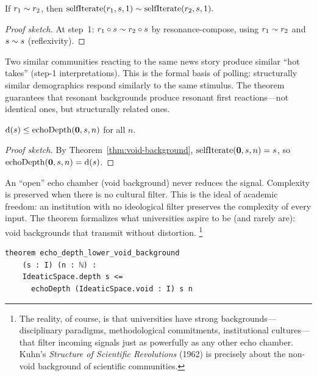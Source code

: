\begin{theorem}
\label{thm:parallel-echo}
If $r_1\sim r_2$, then
$\mathrm{selfIterate}(r_1, s, 1) \sim \mathrm{selfIterate}(r_2, s, 1).$
\end{theorem}

\begin{proof}[Proof sketch]
At step~1: $r_1\circ s \sim r_2\circ s$ by resonance-compose,
using $r_1\sim r_2$ and $s\sim s$ (reflexivity).
\end{proof}

Two similar communities reacting to the same news story produce similar
``hot takes'' (step-1 interpretations).  This is the formal basis of
polling: structurally similar demographics respond similarly to the same
stimulus.  The theorem guarantees that resonant backgrounds produce resonant
first reactions---not identical ones, but structurally related ones.

\begin{theorem}
\label{thm:echo-depth-lower}
$\operatorname{d}(s) \le \mathrm{echoDepth}(\mathbf{0}, s, n)$ for all $n$.
\end{theorem}

\begin{proof}[Proof sketch]
By Theorem~\ref{thm:void-background},
$\mathrm{selfIterate}(\mathbf{0},s,n)=s$, so
$\mathrm{echoDepth}(\mathbf{0},s,n)=\operatorname{d}(s)$.
\end{proof}

An ``open'' echo chamber (void background) never reduces the signal.
Complexity is preserved when there is no cultural filter.  This is the ideal
of academic freedom: an institution with no ideological filter preserves the
complexity of every input.  The theorem formalizes what universities aspire
to be (and rarely are): void backgrounds that transmit without distortion.%
\footnote{The reality, of course, is that universities have strong
backgrounds---disciplinary paradigms, methodological commitments,
institutional cultures---that filter incoming signals just as powerfully as
any other echo chamber.  Kuhn's \textit{Structure of Scientific Revolutions}
(1962) is precisely about the non-void background of scientific communities.}

\begin{lstlisting}[caption={Echo depth lower bound for void background.}]
theorem echo_depth_lower_void_background
    (s : I) (n : ℕ) :
    IdeaticSpace.depth s <=
      echoDepth (IdeaticSpace.void : I) s n
\end{lstlisting}


